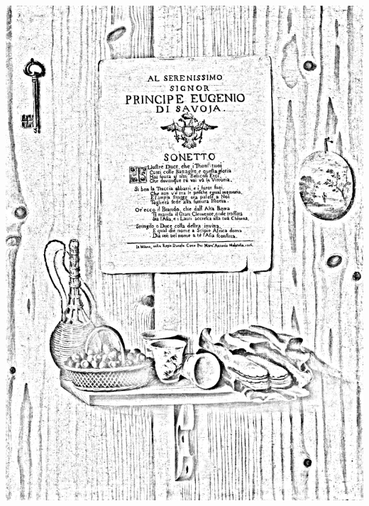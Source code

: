 \documentclass[hidelinks,12pt,a4paper]{article}
\begin{document}
\begin{adjustwidth}{-30mm}{-30mm}
			\thispagestyle{empty}
			\begin{minipage}{0.93\linewidth}
				\centering
				\includegraphics[scale=0.2]{Gianlisi_Antonio_Junior-Trompe_l_oeil_con_sonetto_in_onore_di_Eugenio_di_Savoia_e_mensola_con_oggetti.jpg}
			\end{minipage}
			
			\vspace*{\fill}
			\newpage
			

\end{adjustwidth}
\end{document}
